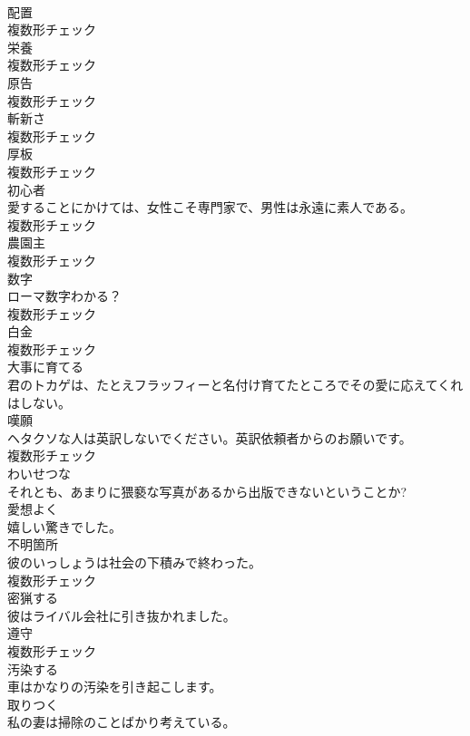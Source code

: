 \documentclass[8pt]{extreport}
\begin{document}
\begin{CJK}{UTF8}{min}
\\	[名詞]	配置	
\\	複数形チェック
\\	[名詞]	栄養	
\\	複数形チェック
\\	[名詞]	原告	
\\	複数形チェック
\\	[名詞]	斬新さ	
\\	複数形チェック
\\	[名詞]	厚板	
\\	複数形チェック
\\	[名詞]	初心者	
\\	愛することにかけては、女性こそ専門家で、男性は永遠に素人である。	
\\	複数形チェック
\\	[名詞]	農園主	
\\	複数形チェック
\\	[名詞]	数字	
\\	ローマ数字わかる？	
\\	複数形チェック
\\	[名詞]	白金	
\\	複数形チェック
\\	[動詞]	大事に育てる	
\\	君のトカゲは、たとえフラッフィーと名付け育てたところでその愛に応えてくれはしない。	
\\	[名詞]	嘆願	
\\	ヘタクソな人は英訳しないでください。英訳依頼者からのお願いです。	
\\	複数形チェック
\\	[形容詞]	わいせつな	
\\	それとも、あまりに猥褻な写真があるから出版できないということか?	
\\	[副詞]	愛想よく	
\\	嬉しい驚きでした。	
\\	[名詞]	不明箇所	
\\	彼のいっしょうは社会の下積みで終わった。	
\\	複数形チェック
\\	[動詞]	密猟する	
\\	彼はライバル会社に引き抜かれました。	
\\	[名詞]	遵守	
\\	複数形チェック
\\	[動詞]	汚染する	
\\	車はかなりの汚染を引き起こします。	
\\	[動詞]	取りつく	
\\	私の妻は掃除のことばかり考えている。	

\end{CJK}
\end{document}
